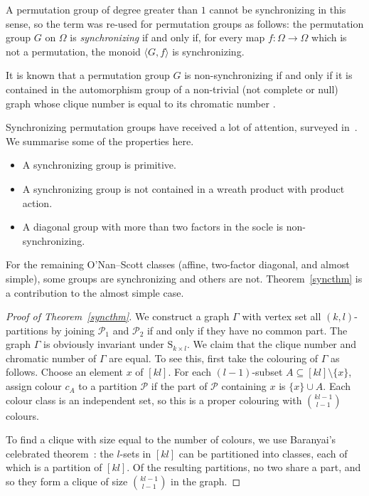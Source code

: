 \documentclass{daj}
\renewcommand\S{\mathrm{S}}
\renewcommand\P{\mathcal{P}}
\theoremstyle{plain}
\theoremstyle{definition}
\begin{document}
A permutation group of degree greater than $1$ cannot be synchronizing in this
sense, so the term was re-used for permutation groups as follows: the
permutation group $G$ on $\Omega$ is \emph{synchronizing} if and only if, for
every map $f:\Omega\to\Omega$ which is not a permutation, the monoid
$\langle G,f\rangle$ is synchronizing.

It is known that a permutation group $G$ is non-synchronizing if and only if
it is contained in the automorphism group of a non-trivial (not complete or
null) graph whose clique number is equal to its chromatic number
\cite[Corollary 4.5]{acs}.


Synchronizing permutation groups have received a lot of attention, surveyed
in~\cite{acs}. We summarise some of the properties here.

\begin{itemize}
\item A synchronizing group is primitive.
\item A synchronizing group is not contained in a wreath product with product
action.
\item A diagonal group with more than two factors in the socle is
non-synchronizing.
\end{itemize}

For the remaining O'Nan--Scott classes (affine, two-factor diagonal, and
almost simple), some groups are synchronizing and others are not. Theorem~\ref{syncthm}
is a contribution to the almost simple case.

\begin{proof}[Proof of Theorem~\ref{syncthm}]
We construct a graph $\Gamma$ with vertex set all $(k,l)$-partitions by joining $\P_1$ and $\P_2$ if and only
if they have no common part. The graph $\Gamma$ is obviously invariant under $\S_{k\times l}$. We claim that the clique number and chromatic number of $\Gamma$ are
equal. To see this, first take the colouring of $\Gamma$ as follows. Choose an element $x$ of $[kl]$. For each $(l-1)$-subset $A\subseteq [kl]\setminus\{x\}$,
assign colour $c_A$ to a partition $\P$ if the part of $\P$ containing $x$ is
$\{x\}\cup A$. Each colour class is an independent set, so this is a
proper colouring with ${kl-1\choose l-1}$ colours.

To find a clique with size equal to the number of colours, we use Baranyai’s celebrated theorem~\cite{baranyai}: the $l$-sets in $[kl]$ can be partitioned into classes, each of which is a partition of $[kl]$. Of the resulting partitions, no two share a part, and so they form a clique of size ${kl-1\choose l-1}$ in the graph. 
\end{proof}
\end{document}

